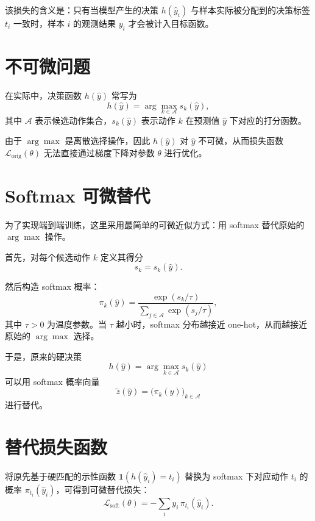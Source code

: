 \documentclass{article}
\begin{document}
该损失的含义是：只有当模型产生的决策 \(h(\hat y_i)\) 与样本实际被分配到的决策标签 \(t_i\) 一致时，样本 \(i\) 的观测结果 \(y_i\) 才会被计入目标函数。

\section{不可微问题}

在实际中，决策函数 \(h(\hat y)\) 常写为
\begin{equation}
h(\hat y)=\arg\max_{k \in \mathcal{A}} s_k(\hat y),
\end{equation}
其中 \(\mathcal{A}\) 表示候选动作集合，\(s_k(\hat y)\) 表示动作 \(k\) 在预测值 \(\hat y\) 下对应的打分函数。

由于 \(\arg\max\) 是离散选择操作，因此 \(h(\hat y)\) 对 \(\hat y\) 不可微，从而损失函数
\(\mathcal{L}_{\text{orig}}(\theta)\) 无法直接通过梯度下降对参数 \(\theta\) 进行优化。

\section{Softmax 可微替代}

为了实现端到端训练，这里采用最简单的可微近似方式：用 softmax 替代原始的 \(\arg\max\) 操作。

首先，对每个候选动作 \(k\) 定义其得分
\begin{equation}
s_k = s_k(\hat y).
\end{equation}

然后构造 softmax 概率：
\begin{equation}
\pi_k(\hat y)
=
\frac{\exp(s_k/\tau)}
{\sum_{j \in \mathcal{A}} \exp(s_j/\tau)},
\end{equation}
其中 \(\tau>0\) 为温度参数。当 \(\tau\) 越小时，softmax 分布越接近 one-hot，从而越接近原始的 \(\arg\max\) 选择。

于是，原来的硬决策
\begin{equation}
h(\hat y)=\arg\max_{k \in \mathcal{A}} s_k(\hat y)
\end{equation}
可以用 softmax 概率向量
\begin{equation}
\tilde z(\hat y)=\bigl(\pi_k(\hat y)\bigr)_{k\in\mathcal{A}}
\end{equation}
进行替代。

\section{替代损失函数}

将原先基于硬匹配的示性函数
\(\mathbf{1}(h(\hat y_i)=t_i)\)
替换为 softmax 下对应动作 \(t_i\) 的概率 \(\pi_{t_i}(\hat y_i)\)，可得到可微替代损失：
\begin{equation}
\mathcal{L}_{\text{soft}}(\theta)
=
- \sum_i y_i \, \pi_{t_i}(\hat y_i).
\end{equation}
\end{document}
